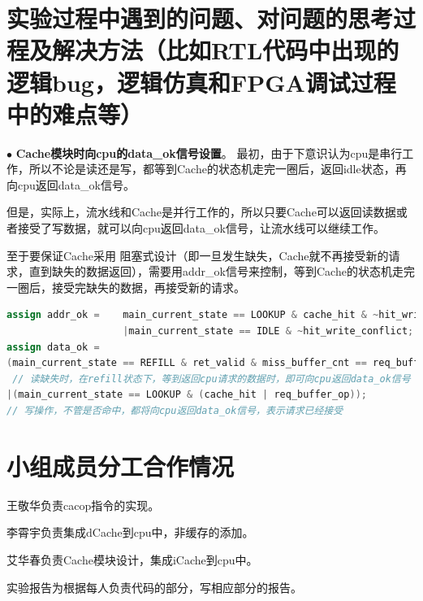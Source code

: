 \documentclass[11pt]{article}
\begin{document}
\section{实验过程中遇到的问题、对问题的思考过程及解决方法（比如RTL代码中出现的逻辑bug，逻辑仿真和FPGA调试过程中的难点等）}

\noindent
$\bullet$
\textbf{Cache模块时向cpu的data\_ok信号设置}。
最初，由于下意识认为cpu是串行工作，所以不论是读还是写，都等到Cache的状态机走完一圈后，返回idle状态，再向cpu返回data\_ok信号。

但是，实际上，流水线和Cache是并行工作的，所以只要Cache可以返回读数据或者接受了写数据，就可以向cpu返回data\_ok信号，让流水线可以继续工作。

至于要保证Cache采用
阻塞式设计（即一旦发生缺失，Cache就不再接受新的请求，直到缺失的数据返回），需要用addr\_ok信号来控制，等到Cache的状态机走完一圈后，接受完缺失的数据，再接受新的请求。

\begin{lstlisting}[language=verilog]
assign addr_ok =    main_current_state == LOOKUP & cache_hit & ~hit_write_conflict      // 如果发生数据缺失，Cache拉低add_ok，不接受新的请求
                    |main_current_state == IDLE & ~hit_write_conflict;
assign data_ok =    
(main_current_state == REFILL & ret_valid & miss_buffer_cnt == req_buffer_offset[3:2] & ~req_buffer_op) 
 // 读缺失时，在refill状态下，等到返回cpu请求的数据时，即可向cpu返回data_ok信号
|(main_current_state == LOOKUP & (cache_hit | req_buffer_op)); 
// 写操作，不管是否命中，都将向cpu返回data_ok信号，表示请求已经接受
\end{lstlisting}


      
\vspace{1ex}

\section{小组成员分工合作情况}
王敬华负责cacop指令的实现。

李霄宇负责集成dCache到cpu中，非缓存的添加。

艾华春负责Cache模块设计，集成iCache到cpu中。

实验报告为根据每人负责代码的部分，写相应部分的报告。
\end{document}
